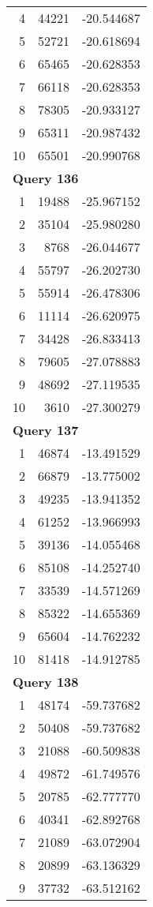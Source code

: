 \begin{longtable}[{p}]{@{}rrp{}@{}}
4 & 44221 & -20.544687 \\
5 & 52721 & -20.618694 \\
6 & 65465 & -20.628353 \\
7 & 66118 & -20.628353 \\
8 & 78305 & -20.933127 \\
9 & 65311 & -20.987432 \\
10 & 65501 & -20.990768 \\
\midrule
\multicolumn{3}{l}{\bfseries Query 136} \\
1 & 19488 & -25.967152 \\
2 & 35104 & -25.980280 \\
3 & 8768 & -26.044677 \\
4 & 55797 & -26.202730 \\
5 & 55914 & -26.478306 \\
6 & 11114 & -26.620975 \\
7 & 34428 & -26.833413 \\
8 & 79605 & -27.078883 \\
9 & 48692 & -27.119535 \\
10 & 3610 & -27.300279 \\
\midrule
\multicolumn{3}{l}{\bfseries Query 137} \\
1 & 46874 & -13.491529 \\
2 & 66879 & -13.775002 \\
3 & 49235 & -13.941352 \\
4 & 61252 & -13.966993 \\
5 & 39136 & -14.055468 \\
6 & 85108 & -14.252740 \\
7 & 33539 & -14.571269 \\
8 & 85322 & -14.655369 \\
9 & 65604 & -14.762232 \\
10 & 81418 & -14.912785 \\
\midrule
\multicolumn{3}{l}{\bfseries Query 138} \\
1 & 48174 & -59.737682 \\
2 & 50408 & -59.737682 \\
3 & 21088 & -60.509838 \\
4 & 49872 & -61.749576 \\
5 & 20785 & -62.777770 \\
6 & 40341 & -62.892768 \\
7 & 21089 & -63.072904 \\
8 & 20899 & -63.136329 \\
9 & 37732 & -63.512162 \\

\end{longtable}
